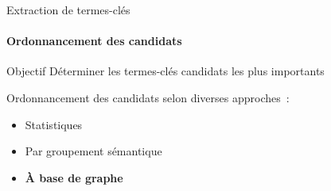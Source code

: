  \begin{frame}{Extraction de termes-clés}\framesubtitle{Ordonnancement des candidats}
    \begin{block}{Objectif}
      Déterminer les termes-clés candidats les plus importants
    \end{block}

    \vspace{1em}

    Ordonnancement des candidats selon diverses approches~:
    \begin{itemize}
      \item{Statistiques~\cite[TF-IDF]{salton1975tfidf}}
      \item{Par groupement sémantique~\cite{matsuo2004wordcooccurrence}}
      \item{\textbf{À base de graphe}~\cite[TextRank]{mihalcea2004textrank}}
    \end{itemize}
  \end{frame}

